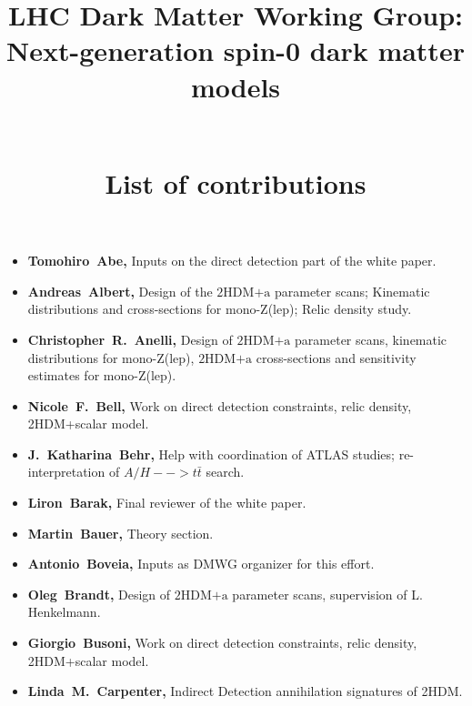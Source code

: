 \documentclass[a4paper, 11pt,notoc]{article}
\newcommand{\hdma}{\ensuremath{\textrm{2HDM+a}}\xspace}
\begin{document}
\title{\begin{boldmath} \huge LHC Dark Matter Working Group:  \\ Next-generation spin-0  dark matter models \vspace{7mm} \end{boldmath} \\ List of contributions}

\maketitle

\begin{itemize}

\item \textbf{Tomohiro~Abe,} Inputs on the direct detection part of the white paper. 

\item \textbf{Andreas~Albert,} Design of the \hdma parameter scans; Kinematic distributions and cross-sections for mono-Z(lep); Relic density study.

\item \textbf{Christopher~R.~Anelli,} Design of \hdma parameter scans,  kinematic distributions for mono-Z(lep), \hdma cross-sections and sensitivity estimates for mono-Z(lep).

\item \textbf{Nicole~F.~Bell,} Work on direct detection constraints, relic density, 2HDM+scalar model.

\item \textbf{J.~Katharina~Behr,} Help with coordination of ATLAS studies; re-interpretation of $A/H-->t\bar{t}$ search.

\item \textbf{Liron~Barak,} Final reviewer of the white paper. 

\item \textbf{Martin~Bauer,} Theory section. 

\item \textbf{Antonio~Boveia,} Inputs as DMWG organizer for this effort. 

\item \textbf{Oleg~Brandt,} Design of \hdma parameter scans, supervision of L. Henkelmann. 

\item \textbf{Giorgio~Busoni,} Work on direct detection constraints, relic density, 2HDM+scalar model.

\item \textbf{Linda~M.~Carpenter,} Indirect Detection annihilation signatures of 2HDM.


\end{itemize}
\end{document}
